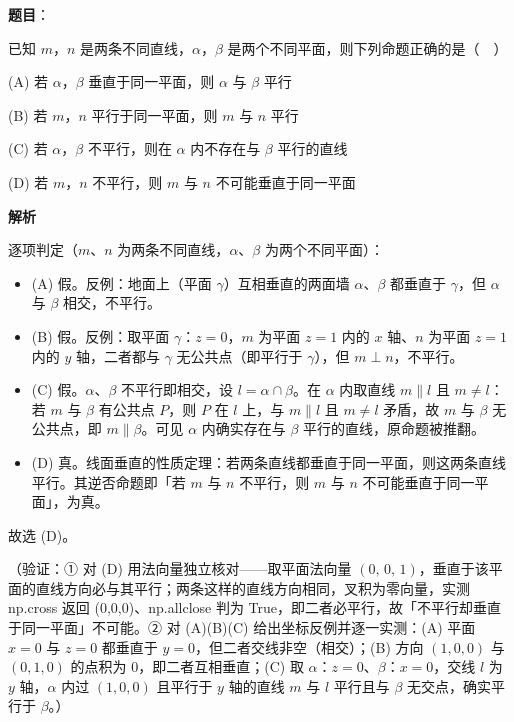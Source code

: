 \begin{answer}

\textbf{题目}：

已知 \(m\)，\(n\) 是两条不同直线，\(\alpha\)，\(\beta\) 是两个不同平面，则下列命题正确的是（　）

(A) 若 \(\alpha\)，\(\beta\) 垂直于同一平面，则 \(\alpha\) 与 \(\beta\) 平行

(B) 若 \(m\)，\(n\) 平行于同一平面，则 \(m\) 与 \(n\) 平行

(C) 若 \(\alpha\)，\(\beta\) 不平行，则在 \(\alpha\) 内不存在与 \(\beta\) 平行的直线

(D) 若 \(m\)，\(n\) 不平行，则 \(m\) 与 \(n\) 不可能垂直于同一平面

\textbf{解析}

逐项判定（\(m\)、\(n\) 为两条不同直线，\(\alpha\)、\(\beta\) 为两个不同平面）：

\begin{itemize}
\item (A) 假。反例：地面上（平面 \(\gamma\)）互相垂直的两面墙 \(\alpha\)、\(\beta\) 都垂直于 \(\gamma\)，但 \(\alpha\) 与 \(\beta\) 相交，不平行。
\item (B) 假。反例：取平面 \(\gamma\)：\(z=0\)，\(m\) 为平面 \(z=1\) 内的 \(x\) 轴、\(n\) 为平面 \(z=1\) 内的 \(y\) 轴，二者都与 \(\gamma\) 无公共点（即平行于 \(\gamma\)），但 \(m\perp n\)，不平行。
\item (C) 假。\(\alpha\)、\(\beta\) 不平行即相交，设 \(l=\alpha\cap\beta\)。在 \(\alpha\) 内取直线 \(m\parallel l\) 且 \(m\neq l\)：若 \(m\) 与 \(\beta\) 有公共点 \(P\)，则 \(P\) 在 \(l\) 上，与 \(m\parallel l\) 且 \(m\neq l\) 矛盾，故 \(m\) 与 \(\beta\) 无公共点，即 \(m\parallel\beta\)。可见 \(\alpha\) 内确实存在与 \(\beta\) 平行的直线，原命题被推翻。
\item (D) 真。线面垂直的性质定理：若两条直线都垂直于同一平面，则这两条直线平行。其逆否命题即「若 \(m\) 与 \(n\) 不平行，则 \(m\) 与 \(n\) 不可能垂直于同一平面」，为真。
\end{itemize}

故选 (D)。

（验证：① 对 (D) 用法向量独立核对——取平面法向量 \((0,\,0,\,1)\)，垂直于该平面的直线方向必与其平行；两条这样的直线方向相同，叉积为零向量，实测 np.cross 返回 (0,0,0)、np.allclose 判为 True，即二者必平行，故「不平行却垂直于同一平面」不可能。② 对 (A)(B)(C) 给出坐标反例并逐一实测：(A) 平面 \(x=0\) 与 \(z=0\) 都垂直于 \(y=0\)，但二者交线非空（相交）；(B) 方向 \((1,0,0)\) 与 \((0,1,0)\) 的点积为 \(0\)，即二者互相垂直；(C) 取 \(\alpha\)：\(z=0\)、\(\beta\)：\(x=0\)，交线 \(l\) 为 \(y\) 轴，\(\alpha\) 内过 \((1,0,0)\) 且平行于 \(y\) 轴的直线 \(m\) 与 \(l\) 平行且与 \(\beta\) 无交点，确实平行于 \(\beta\)。）


\end{answer}
